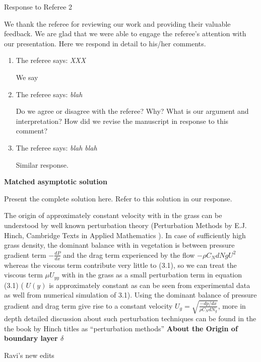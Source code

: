 \documentclass[letterpaper,10pt]{article}
\begin{document}
\newpage
\centerline{Response to Referee 2}
We thank the referee for reviewing our work and providing their valuable feedback. 
We are glad that we were able to engage the referee's attention with our presentation.
Here we respond in detail to his/her comments.
\begin{enumerate}
\item The referee says:
\textit{
XXX
}

We say

\item The referee says:
\textit{
blah
}

Do we agree or disagree with the referee? Why? What is our argument and interpretation? How did we revise the manuscript in response to this comment?

\item The referee says:
\textit{
blah blah
}

Similar response.

\end{enumerate}

\newpage
\centerline{\textbf{Matched asymptotic solution}}
Present the complete solution here. Refer to this solution in our response.

The origin of approximately constant velocity with in the grass 
can be understood by well known perturbation theory (Perturbation Methods by E.J. Hinch, Cambridge Texts in Applied Mathematics ). In case of sufficiently high grass density, the dominant balance
with in vegetation is between pressure gradient term $-\frac{dP}{dx}$ and the drag term experienced by the flow $-\rho C_N dNg U^2$ whereas the viscous term contribute very little 
to (3.1), so we can treat the viscous term $\mu U_{yy}$ with in the grass as a small perturbation term in equation (3.1) ( $U(y)$ is approximately constant as can be seen from experimental data as well from
numerical simulation of 3.1). Using the dominant balance of pressure gradient and drag term 
give rise to a constant velocity $U_g = \sqrt{\frac{-dp/dx}{\rho C_N d N_g}}$, more in depth detailed discussion about such perturbation techniques can be found in the the book by Hinch titles as ``perturbation
methods''
\newline
\textbf{ About the Origin of boundary layer $\delta$}

\centerline{Ravi's new edits}
\end{document}
